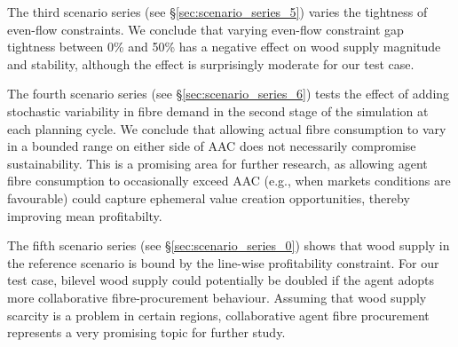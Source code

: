 
The third scenario series (see \S\ref{sec:scenario_series_5}) varies the tightness of even-flow constraints. We conclude that varying even-flow constraint gap tightness between 0\% and 50\% has a negative effect on wood supply magnitude and stability, although the effect is surprisingly moderate for our test case.

The fourth scenario series (see \S\ref{sec:scenario_series_6}) tests the effect of adding stochastic variability in fibre demand in the second stage of the simulation at each planning cycle. We conclude that allowing actual fibre consumption to vary in a bounded range on either side of AAC does not necessarily compromise sustainability. This is a promising area for further research, as allowing agent fibre consumption to occasionally exceed AAC (e.g., when markets conditions are favourable) could capture ephemeral value creation opportunities, thereby improving mean profitabilty.

The fifth scenario series (see \S\ref{sec:scenario_series_0}) shows that wood supply in the reference scenario is bound by the line-wise profitability constraint. For our test case, bilevel wood supply could potentially be doubled if the agent adopts more collaborative fibre-procurement behaviour. Assuming that wood supply scarcity is a problem in certain regions, collaborative agent fibre procurement represents a very promising topic for further study.


